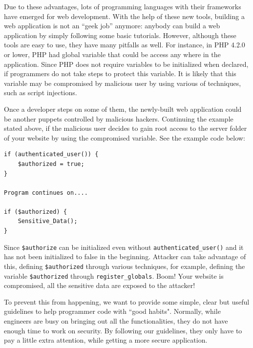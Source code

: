 \documentclass[conference]{IEEEtran}
\begin{document}
Due to these advantages, lots of programming languages with their frameworks have
emerged for web development. With the help of these new tools,
building a web application is not an ``geek job'' anymore:
anybody can build a web application by simply following some basic tutorials.
However, although these tools are easy to use,
they have many pitfalls as well. For instance, in PHP 4.2.0 or lower, PHP had global variable that could be access 
any where in the application. Since PHP does not require variables to be initialized when declared, if programmers
do not take steps to protect this variable. It is likely that this variable may be compromised by malicious user by
using various of techniques, such as script injections.

Once a developer steps on some of them, the newly-built web application could
be another puppets controlled by malicious hackers. Continuing the example stated above, if the malicious user
decides to gain root access to the server folder of your website by using the compromised variable. See the example code below:
\begin{framed}
\begin{verbatim}
if (authenticated_user()) {
    $authorized = true;
}

Program continues on....

if ($authorized) {
    Sensitive_Data();
}
\end{verbatim}
\end{framed}

Since \texttt{\$authorize} can be initialized even without \texttt{authenticated\_user()} and it has not been initialized to false in the beginning. Attacker
can take advantage of this, defining \texttt{\$authorized} through various techniques, for example, defining the variable \texttt{\$authorized} through \texttt{register\_globals}. 
Boom! Your website is compromised, all the sensitive data are exposed to the attacker!

To prevent this from happening, we want to provide some simple, clear but
useful guidelines to help programmer code with ``good habits".
Normally, while engineers are busy on bringing out all the functionalities,
they do not have enough time to work on security. By following our guidelines,
they only have to pay a little extra attention, while getting a more secure application.
\end{document}
